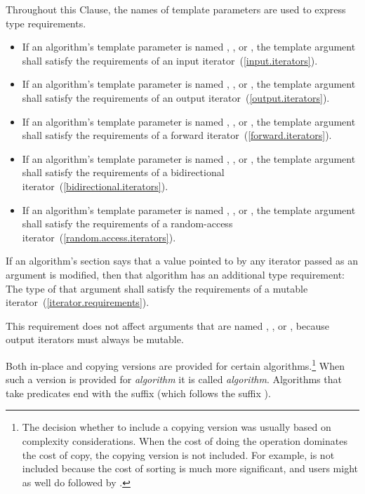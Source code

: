 \pnum
Throughout this Clause, the names of template parameters
are used to express type requirements.
\begin{itemize}
\item
If an algorithm's template parameter is named
,
,
or
,
the template argument shall satisfy the
requirements of an input iterator~(\ref{input.iterators}).
\item
If an algorithm's template parameter is named
,
,
or
,
the template argument shall satisfy the requirements
of an output iterator~(\ref{output.iterators}).
\item
If an algorithm's template parameter is named
,
,
or
,
the template argument shall satisfy the requirements
of a forward iterator~(\ref{forward.iterators}).
\item
If an algorithm's template parameter is named
,
,
or
,
the template argument shall satisfy the requirements
of a bidirectional iterator~(\ref{bidirectional.iterators}).
\item
If an algorithm's template parameter is named
,
,
or
,
the template argument shall satisfy the requirements
of a random-access iterator~(\ref{random.access.iterators}).
\end{itemize}

\pnum
If an algorithm's
\effects
section says that a value pointed to by any iterator passed
as an argument is modified, then that algorithm has an additional
type requirement:
The type of that argument shall satisfy the requirements
of a mutable iterator~(\ref{iterator.requirements}).
\begin{note}
This requirement does not affect arguments that are named
,
,
or
,
because output iterators must always be mutable.
\end{note}

\pnum
Both in-place and copying versions are provided for certain
algorithms.\footnote{The decision whether to include a copying version was
usually based on complexity considerations. When the cost of doing the operation
dominates the cost of copy, the copying version is not included. For example,
 is not included because the cost of sorting is much more
significant, and users might as well do  followed by .}
When such a version is provided for \textit{algorithm} it is called
\textit{algorithm}. Algorithms that take predicates end with the
suffix  (which follows the suffix ).

